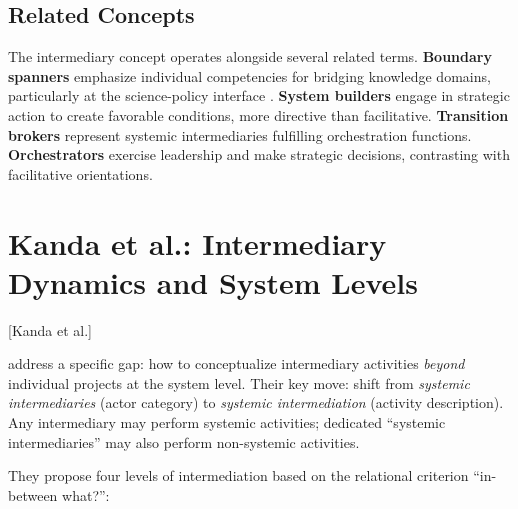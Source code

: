 \documentclass[../main.tex]{subfiles}
\begin{document}
\subsection{Related Concepts}

The intermediary concept operates alongside several related terms. \textbf{Boundary spanners} emphasize individual competencies for bridging knowledge domains, particularly at the science-policy interface \cite{tushman1977boundary}. \textbf{System builders} engage in strategic action to create favorable conditions, more directive than facilitative. \textbf{Transition brokers} represent systemic intermediaries fulfilling orchestration functions. \textbf{Orchestrators} exercise leadership and make strategic decisions, contrasting with facilitative orientations.


\section{Kanda et al.: Intermediary Dynamics and System Levels}[Kanda et al.]

\textcite{kanda2020conceptualising} address a specific gap: how to conceptualize intermediary activities \textit{beyond} individual projects at the system level. Their key move: shift from \textit{systemic intermediaries} (actor category) to \textit{systemic intermediation} (activity description). Any intermediary may perform systemic activities; dedicated ``systemic intermediaries'' may also perform non-systemic activities.

They propose four levels of intermediation based on the relational criterion ``in-between what?'':
\end{document}
